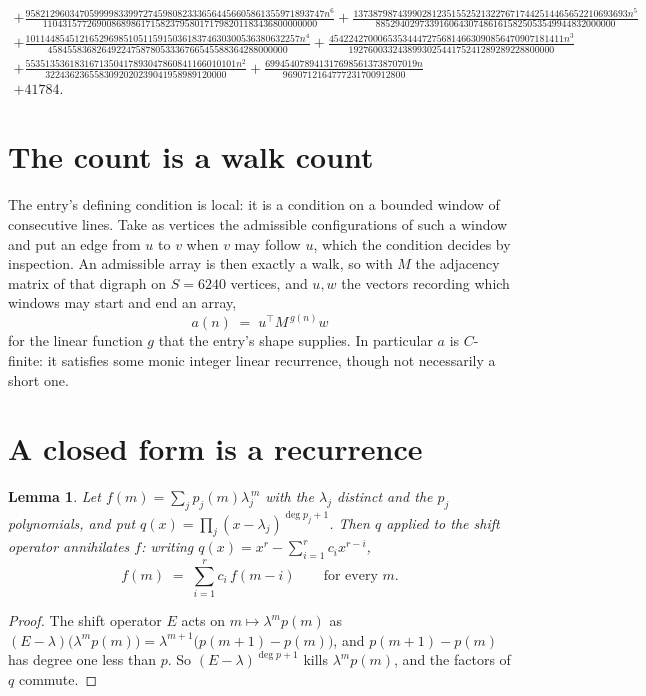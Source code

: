 \documentclass[11pt,a4paper]{article}
\theoremstyle{plain}
\newtheorem{lemma}[theorem]{Lemma}
\theoremstyle{definition}
\begin{document}
\begin{multline*}
+ \frac{9582129603470599998339972745980823336564456605861355971893747 n^{6}}{11043157726900868986171582379580171798201183436800000000} + \frac{13738798743990281235155252132276717442514465652210693693 n^{5}}{8852940297339160643074861615825053549944832000000} \\
+ \frac{10114485451216529698510511591503618374630300536380632257 n^{4}}{4584558368264922475878053336766545588364288000000} + \frac{454224270006535344472756814663090856470907181411 n^{3}}{192760033243899302544175241289289228800000} \\
+ \frac{5535135361831671350417893047860841166010101 n^{2}}{3224362365583092020239041958989120000} + \frac{6994540789413176985613738707019 n}{9690712164777231700912800} \\
+ 41784.
\end{multline*}

\section{The count is a walk count}

The entry's defining condition is local: it is a condition on a bounded window of consecutive lines. Take as vertices the
admissible configurations of such a window and put an edge from $u$ to $v$ when $v$ may
follow $u$, which the condition decides by inspection. An admissible array is then exactly a
walk, so with $M$ the adjacency matrix of that digraph on $S=6240$ vertices, and $u,w$ the
vectors recording which windows may start and end an array,
\[
a(n)\;=\;u^{\!\top}M^{\,g(n)}w
\]
for the linear function $g$ that the entry's shape supplies. In particular $a$ is
$C$-finite: it satisfies some monic integer linear recurrence, though not necessarily a short
one.

\section{A closed form is a recurrence}

\begin{lemma}\label{lem:ann}
Let $f(m)=\sum_{j}p_j(m)\lambda_j^{\,m}$ with the $\lambda_j$ distinct and the $p_j$
polynomials, and put $q(x)=\prod_j(x-\lambda_j)^{\deg p_j+1}$. Then $q$ applied to the shift
operator annihilates $f$: writing $q(x)=x^{r}-\sum_{i=1}^{r}c_ix^{r-i}$,
\[
f(m)\;=\;\sum_{i=1}^{r}c_i\,f(m-i)\qquad\text{for every }m.
\]
\end{lemma}

\begin{proof}
The shift operator $E$ acts on $m\mapsto\lambda^{m}p(m)$ as
$(E-\lambda)\bigl(\lambda^{m}p(m)\bigr)=\lambda^{m+1}\bigl(p(m+1)-p(m)\bigr)$, and
$p(m+1)-p(m)$ has degree one less than $p$. So $(E-\lambda)^{\deg p+1}$ kills
$\lambda^{m}p(m)$, and the factors of $q$ commute.
\end{proof}
\end{document}
